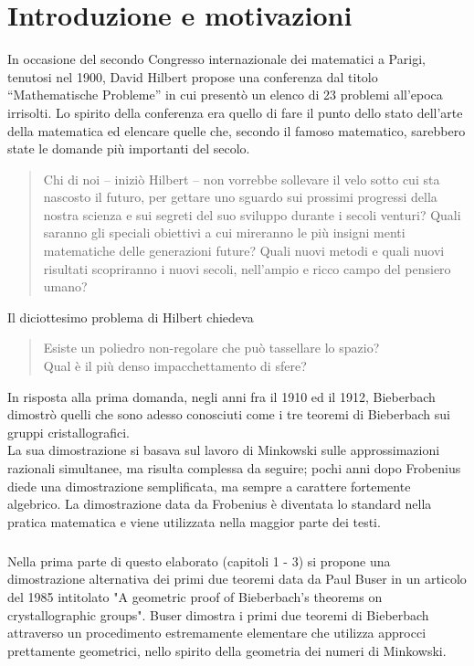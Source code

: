 \documentclass[a4paper,11pt,openright,twoside	]{book}
\author{Elisa Caruso}
\begin{document}
 

\chapter*{Introduzione e motivazioni}

In occasione del secondo Congresso internazionale dei matematici a Parigi, tenutosi nel 1900,  David Hilbert propose una conferenza dal titolo “Mathematische Probleme” in cui presentò un elenco di 23 problemi all'epoca irrisolti. Lo spirito della conferenza era quello di fare il punto dello stato dell'arte della matematica ed elencare quelle che, secondo il famoso matematico, sarebbero state le domande più importanti del secolo. \begin{quote}
Chi di noi – iniziò Hilbert – non vorrebbe sollevare il velo sotto cui sta nascosto il futuro, per gettare uno sguardo sui prossimi progressi della nostra scienza e sui segreti del suo sviluppo durante i secoli venturi? Quali saranno gli speciali obiettivi a cui mireranno le più insigni menti matematiche delle generazioni future? Quali nuovi metodi e quali nuovi risultati scopriranno i nuovi secoli, nell’ampio e ricco campo del pensiero umano?
\end{quote}
Il diciottesimo problema di Hilbert chiedeva
\begin{quote}
Esiste un poliedro non-regolare che può tassellare lo spazio? \\
Qual è il più denso impacchettamento di sfere?	
\end{quote}
In risposta alla prima domanda, negli anni fra il 1910 ed il 1912, Bieberbach dimostrò quelli che sono adesso conosciuti come i tre teoremi di Bieberbach sui gruppi cristallografici. \\
La sua dimostrazione si basava sul lavoro di Minkowski sulle approssimazioni razionali simultanee, ma risulta complessa da seguire; pochi anni dopo Frobenius diede una dimostrazione semplificata, ma sempre a carattere fortemente algebrico. La dimostrazione data da Frobenius è diventata lo standard nella pratica matematica e viene utilizzata nella maggior parte dei testi.
\paragraph{}
Nella prima parte di questo elaborato (capitoli 1 - 3) si propone una dimostrazione alternativa dei primi due teoremi data da Paul Buser in un articolo del 1985 intitolato "A geometric proof of Bieberbach's theorems on crystallographic groups". Buser dimostra i primi due teoremi di Bieberbach attraverso un procedimento estremamente elementare che utilizza approcci prettamente geometrici, nello spirito della geometria dei numeri di Minkowski. 
\end{document}
